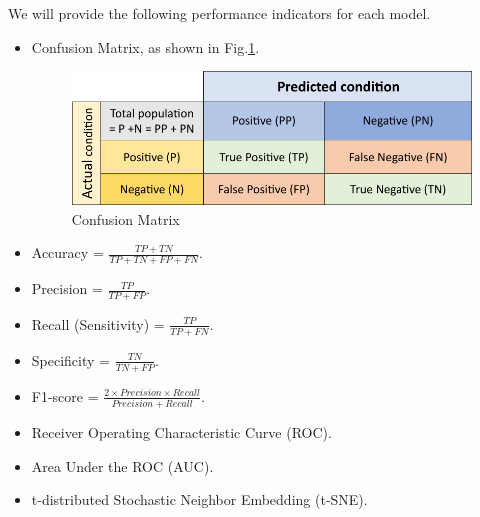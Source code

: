 \documentclass{article}
\begin{document}
		We will provide the following performance indicators for each model.
		\vspace{0.1cm}
		\begin{itemize}
			\vspace{-0.2cm}
			\item Confusion Matrix, as shown in Fig.\ref{fig:cm}.
			\begin{figure}[htbp]
				\centering
				\includegraphics[width=0.5\linewidth]{ConfusionMatrix.pdf}
				\vspace{0.1cm}
				\caption{Confusion Matrix}
				\label{fig:cm}
			\end{figure}
			
			\vspace{-0.2cm} 
			\item Accuracy = $\displaystyle \frac{TP+TN}{TP+TN+FP+FN}$.

			\vspace{0.1cm} 
			\item Precision = $\displaystyle \frac{TP}{TP+FP}$.
			
			\vspace{0.1cm} 
			\item Recall (Sensitivity) = $\displaystyle \frac{TP}{TP+FN}$.
			
			\vspace{0.1cm} 
			\item Specificity = $\displaystyle \frac{TN}{TN+FP}$.
			
			\vspace{0.1cm} 
			\item F1-score = $\displaystyle \frac{2\times Precision\times Recall}{Precision+Recall}$.
			
			\vspace{0.1cm} 
			\item Receiver Operating Characteristic Curve (ROC).
			\vspace{-0.1cm} 
			\item Area Under the ROC (AUC).
			\vspace{-0.1cm} 
			\item t-distributed Stochastic Neighbor Embedding (t-SNE).
			
		\end{itemize}	
	
\end{document}
